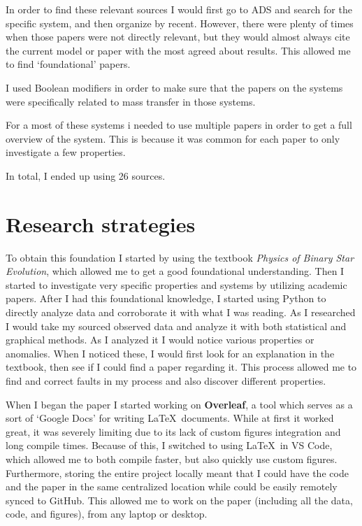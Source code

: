 \documentclass[12pt, a4paper]{article}
\begin{document}
    In order to find these relevant sources I would first go to ADS and search for the specific system, and then organize by recent. However, there were plenty of times when those papers were not directly relevant, but they would almost always cite the current model or paper with the most agreed about results. This allowed me to find `foundational' papers.

    I used Boolean modifiers in order to make sure that the papers on the systems were specifically related to mass transfer in those systems.

    For a most of these systems i needed to use multiple papers in order to get a full overview of the system. This is because it was common for each paper to only investigate a few properties.

    In total, I ended up using 26 sources.
\section{Research strategies}
    To obtain this foundation I started by using the textbook \textit{Physics of Binary Star Evolution}, which allowed me to get a good foundational understanding. Then I started to investigate very specific properties and systems by utilizing academic papers. After I had this foundational knowledge, I started using Python to directly analyze data and corroborate it with what I was reading. As I researched I would take my sourced observed data and analyze it with both statistical and graphical methods. As I analyzed it I would notice various properties or anomalies. When I noticed these, I would first look for an explanation in the textbook, then see if I could find a paper regarding it. This process allowed me to find and correct faults in my process and also discover different properties. 

   When I began the paper I started working on \textbf{Overleaf}, a tool which serves as a sort of `Google Docs' for writing \LaTeX~documents. While at first it worked great, it was severely limiting due to its lack of custom figures integration and long compile times. Because of this, I switched to using \LaTeX~in VS Code, which allowed me to both compile faster, but also quickly use custom figures. Furthermore, storing the entire project locally meant that I could have the code and the paper in the same centralized location while could be easily remotely synced to GitHub. This allowed me to work on the paper (including all the data, code, and figures), from any laptop or desktop.
\end{document}
